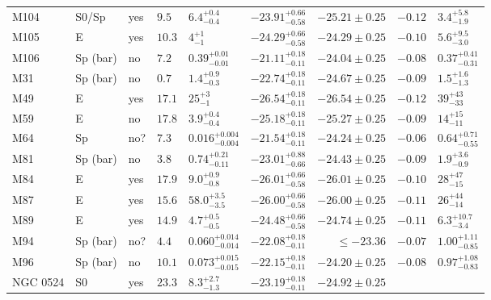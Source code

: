 \begin{table*}
\begin{center}
\begin{tabular}{llllllrll}
M104  &  S0/Sp  &  yes   &  $9.5$  &  $6.4_{-0.4}^{+0.4}$   &  $-23.91_{-0.58}^{+0.66}$   &  $-25.21 \pm 0.25$ 
 &  $-0.12$  &  $3.4_{-1.9}^{+5.8}$   \\ 
M105  &  E  &  yes   &  $10.3$  &  $4_{-1}^{+1}$   &  $-24.29_{-0.58}^{+0.66}$   &  $-24.29 \pm 0.25$ 
 &  $-0.10$  &  $5.6_{-3.0}^{+9.5}$   \\ 
M106  &  Sp (bar)  &  no   &  $7.2$  &  $0.39_{-0.01}^{+0.01}$   &  $-21.11_{-0.11}^{+0.18}$   &  $-24.04 \pm 0.25$ 
 &  $-0.08$  &  $0.37_{-0.31}^{+0.41}$   \\ 
M31  &  Sp (bar)  &  no   &  $0.7$  &  $1.4_{-0.3}^{+0.9}$   &  $-22.74_{-0.11}^{+0.18}$   &  $-24.67 \pm 0.25$ 
 &  $-0.09$  &  $1.5_{-1.3}^{+1.6}$   \\ 
M49  &  E  &  yes   &  $17.1$  &  $25_{-1}^{+3}$   &  $-26.54_{-0.11}^{+0.18}$   &  $-26.54 \pm 0.25$ 
 &  $-0.12$  &  $39_{-33}^{+43}$   \\ 
M59  &  E  &  no   &  $17.8$  &  $3.9_{-0.4}^{+0.4}$   &  $-25.18_{-0.11}^{+0.18}$   &  $-25.27 \pm 0.25$ 
 &  $-0.09$  &  $14_{-11}^{+15}$   \\ 
M64  &  Sp  &  no?  &  $7.3$  &  $0.016_{-0.004}^{+0.004}$   &  $-21.54_{-0.11}^{+0.18}$   &  $-24.24 \pm 0.25$ 
 &  $-0.06$  &  $0.64_{-0.55}^{+0.71}$   \\ 
M81  &  Sp (bar)  &  no   &  $3.8$  &  $0.74_{-0.11}^{+0.21}$   &  $-23.01_{-0.66}^{+0.88}$   &  $-24.43 \pm 0.25$ 
 &  $-0.09$  &  $1.9_{-0.9}^{+3.6}$   \\ 
M84  &  E  &  yes   &  $17.9$  &  $9.0_{-0.8}^{+0.9}$   &  $-26.01_{-0.58}^{+0.66}$   &  $-26.01 \pm 0.25$ 
 &  $-0.10$  &  $28_{-15}^{+47}$   \\ 
M87  &  E  &  yes   &  $15.6$  &  $58.0_{-3.5}^{+3.5}$   &  $-26.00_{-0.58}^{+0.66}$   &  $-26.00 \pm 0.25$ 
 &  $-0.11$  &  $26_{-14}^{+44}$   \\ 
M89  &  E  &  yes   &  $14.9$  &  $4.7_{-0.5}^{+0.5}$   &  $-24.48_{-0.58}^{+0.66}$   &  $-24.74 \pm 0.25$ 
 &  $-0.11$  &  $6.3_{-3.4}^{+10.7}$   \\ 
M94  &  Sp (bar)  &  no?  &  $4.4$  &  $0.060_{-0.014}^{+0.014}$   &  $-22.08_{-0.11}^{+0.18}$   &  $\leq-23.36$   &  $-0.07$  &  $1.00_{-0.85}^{+1.11}$   \\ 
M96  &  Sp (bar)  &  no   &  $10.1$  &  $0.073_{-0.015}^{+0.015}$   &  $-22.15_{-0.11}^{+0.18}$   &  $-24.20 \pm 0.25$ 
 &  $-0.08$  &  $0.97_{-0.83}^{+1.08}$   \\ 
NGC 0524  &  S0  &  yes   &  $23.3$  &  $8.3_{-1.3}^{+2.7}$   &  $-23.19_{-0.11}^{+0.18}$   &  $-24.92 \pm 0.25$ 

\end{tabular}
\end{center}
\end{table*}
